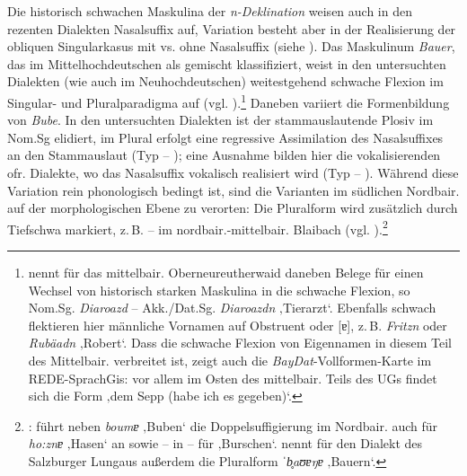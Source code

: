Die historisch schwachen Maskulina der {\textit{n}}\textit{{}-Deklination} weisen auch in den rezenten Dialekten Nasalsuffix auf, Variation besteht aber in der Realisierung der obliquen Singularkasus mit vs. ohne Nasalsuffix (siehe ). Das Maskulinum \textit{Bauer}, das \citet[§36]{Paul1968} im Mittelhochdeutschen als gemischt klassifiziert, weist in den untersuchten Dialekten (wie auch im Neuhochdeutschen) weitestgehend schwache Flexion im Singular- und Pluralparadigma auf (vgl. ).\footnote{\citet[122]{Steininger1994} nennt für das mittelbair. Oberneureutherwaid daneben Belege für einen Wechsel von historisch starken Maskulina in die schwache Flexion, so Nom.Sg. \textit{Diaroazd} -- Akk./Dat.Sg. \textit{Diaroazdn} ‚Tierarzt‘. Ebenfalls schwach flektieren hier männliche Vornamen auf Obstruent oder [ɐ], z.\,B. \textit{Fritzn} oder \textit{Rubäadn} ‚Robert‘. Dass die schwache Flexion von Eigennamen in diesem Teil des Mittelbair. verbreitet ist, zeigt auch die \textit{BayDat}{}-Vollformen-Karte im REDE-SprachGis: vor allem im Osten des mittelbair. Teils des UGs findet sich die Form   ‚dem Sepp (habe ich es gegeben)‘.} Daneben variiert die Formenbildung von \textit{Bube}. In den untersuchten Dialekten ist der stammauslautende Plosiv im Nom.Sg elidiert, im Plural erfolgt eine regressive Assimilation des Nasalsuffixes an den Stammauslaut (Typ  -- ); eine Ausnahme bilden hier die vokalisierenden ofr. Dialekte, wo das Nasalsuffix vokalisch realisiert wird (Typ  -- ). Während diese Variation rein phonologisch bedingt ist, sind die Varianten im südlichen Nordbair. auf der morphologischen Ebene zu verorten: Die Pluralform wird zusätzlich durch Tiefschwa markiert, z.\,B.  --  im nordbair.-mittelbair. Blaibach (vgl. ).{\footnote{\citet[425]{Rowley1990b}: führt neben \textit{boumɐ} ‚Buben‘ die Doppelsuffigierung im Nordbair. auch für \textit{ho:znɐ} ‚Hasen‘ an sowie -- in \citet[138]{Rowley1997} -- für  ‚Burschen‘. \citet[213]{Mauser1998a} nennt für den Dialekt des Salzburger Lungaus außerdem die Pluralform \textit{ˈb̥aʊɐŋɐ} ‚Bauern‘.}}

